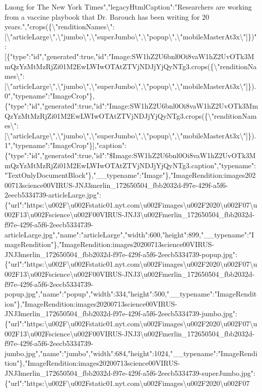 Luong for The New York Times","legacyHtmlCaption":"Researchers are
working from a vaccine playbook that Dr. Barouch has been writing for 20
years.","crops(\{\textbackslash{}"renditionNames\textbackslash{}":{[}\textbackslash{}"articleLarge\textbackslash{}",\textbackslash{}"jumbo\textbackslash{}",\textbackslash{}"superJumbo\textbackslash{}",\textbackslash{}"popup\textbackslash{}",\textbackslash{}"mobileMasterAt3x\textbackslash{}"{]}\})":{[}\{"type":"id","generated":true,"id":"Image:SW1hZ2U6bnl0Oi8vaW1hZ2UvOTk3MmQzYzMtMzRjZi01M2EwLWIwOTAtZTVjNDJjYjQyNTg3.crops(\{\textbackslash{}"renditionNames\textbackslash{}":{[}\textbackslash{}"articleLarge\textbackslash{}",\textbackslash{}"jumbo\textbackslash{}",\textbackslash{}"superJumbo\textbackslash{}",\textbackslash{}"popup\textbackslash{}",\textbackslash{}"mobileMasterAt3x\textbackslash{}"{]}\}).0","typename":"ImageCrop"\},\{"type":"id","generated":true,"id":"Image:SW1hZ2U6bnl0Oi8vaW1hZ2UvOTk3MmQzYzMtMzRjZi01M2EwLWIwOTAtZTVjNDJjYjQyNTg3.crops(\{\textbackslash{}"renditionNames\textbackslash{}":{[}\textbackslash{}"articleLarge\textbackslash{}",\textbackslash{}"jumbo\textbackslash{}",\textbackslash{}"superJumbo\textbackslash{}",\textbackslash{}"popup\textbackslash{}",\textbackslash{}"mobileMasterAt3x\textbackslash{}"{]}\}).1","typename":"ImageCrop"\}{]},"caption":\{"type":"id","generated":true,"id":"\$Image:SW1hZ2U6bnl0Oi8vaW1hZ2UvOTk3MmQzYzMtMzRjZi01M2EwLWIwOTAtZTVjNDJjYjQyNTg3.caption","typename":"TextOnlyDocumentBlock"\},"\_\_typename":"Image"\},"ImageRendition:images20200713science00VIRUS-JNJ3merlin\_172650504\_fbb2032d-f97e-429f-a5f6-2eecb5334739-articleLarge.jpg":\{"url":"https:\textbackslash{}u002F\textbackslash{}u002Fstatic01.nyt.com\textbackslash{}u002Fimages\textbackslash{}u002F2020\textbackslash{}u002F07\textbackslash{}u002F13\textbackslash{}u002Fscience\textbackslash{}u002F00VIRUS-JNJ3\textbackslash{}u002Fmerlin\_172650504\_fbb2032d-f97e-429f-a5f6-2eecb5334739-articleLarge.jpg","name":"articleLarge","width":600,"height":899,"\_\_typename":"ImageRendition"\},"ImageRendition:images20200713science00VIRUS-JNJ3merlin\_172650504\_fbb2032d-f97e-429f-a5f6-2eecb5334739-popup.jpg":\{"url":"https:\textbackslash{}u002F\textbackslash{}u002Fstatic01.nyt.com\textbackslash{}u002Fimages\textbackslash{}u002F2020\textbackslash{}u002F07\textbackslash{}u002F13\textbackslash{}u002Fscience\textbackslash{}u002F00VIRUS-JNJ3\textbackslash{}u002Fmerlin\_172650504\_fbb2032d-f97e-429f-a5f6-2eecb5334739-popup.jpg","name":"popup","width":334,"height":500,"\_\_typename":"ImageRendition"\},"ImageRendition:images20200713science00VIRUS-JNJ3merlin\_172650504\_fbb2032d-f97e-429f-a5f6-2eecb5334739-jumbo.jpg":\{"url":"https:\textbackslash{}u002F\textbackslash{}u002Fstatic01.nyt.com\textbackslash{}u002Fimages\textbackslash{}u002F2020\textbackslash{}u002F07\textbackslash{}u002F13\textbackslash{}u002Fscience\textbackslash{}u002F00VIRUS-JNJ3\textbackslash{}u002Fmerlin\_172650504\_fbb2032d-f97e-429f-a5f6-2eecb5334739-jumbo.jpg","name":"jumbo","width":684,"height":1024,"\_\_typename":"ImageRendition"\},"ImageRendition:images20200713science00VIRUS-JNJ3merlin\_172650504\_fbb2032d-f97e-429f-a5f6-2eecb5334739-superJumbo.jpg":\{"url":"https:\textbackslash{}u002F\textbackslash{}u002Fstatic01.nyt.com\textbackslash{}u002Fimages\textbackslash{}u002F2020\textbackslash{}u002F07\text
